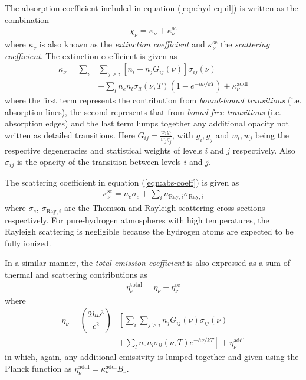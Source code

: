 		The absorption coefficient included in equation (\ref{eqn:hyd-equil}) is written as the combination
		\begin{align}
			\chi_\nu=\kappa_\nu+\kappa_\nu^\text{sc} \label{eqn:abs-coeff}
		\end{align}
		where $\kappa_\nu$ is also known as the \textit{extinction coefficient} and $\kappa_\nu^\text{sc}$ the \textit{scattering coefficient}. The extinction coefficient is given as
		\begin{align}
			\kappa_\nu=\sum_{i}&\sum_{j>i}{[n_i-n_jG_{ij}(\nu)]\sigma_{ij}(\nu)} \nonumber\\
							&+\sum_{l}{n_en_l\sigma_{ll}(\nu,T)\left( 1-e^{-h\nu/kT} \right)}+\kappa_\nu^\text{addl} \label{eqn:ext-abs-coeff}
		\end{align}
		where the first term represents the contribution from \textit{bound-bound transitions} (i.e. absorption lines), the second represents that from \textit{bound-free transitions} (i.e. absorption edges) and the last term lumps together any additional opacity not written as detailed transitions. Here $G_{ij}=\frac{w_ig_i}{w_jg_j}$, with $g_i,g_j$ and $w_i,w_j$ being the respective degeneracies and statistical weights of levels $i$ and $j$ respectively. Also $\sigma_{ij}$ is the opacity of the transition between levels $i$ and $j$.
		
		The scattering coefficient in equation (\ref{eqn:abs-coeff}) is given as
		\begin{align}
			\kappa_\nu^\text{sc}=n_e\sigma_e + \sum_i{n_{\text{Ray},i}\sigma_{\text{Ray},i}} \label{eqn:sca-abs-coeff}
		\end{align}
		where $\sigma_e$, $\sigma_{\text{Ray},i}$ are the Thomson and Rayleigh scattering cross-sections respectively. For pure-hydrogen atmospheres with high temperatures, the Rayleigh scattering is negligible because the hydrogen atoms are expected to be fully ionized.
		
		In a similar manner, the \textit{total emission coefficient} is also expressed as a sum of thermal and scattering contributions as
		\begin{align}
			\eta_\nu^\text{total}=\eta_\nu+\eta_\nu^\text{sc} \label{eqn:em-coeff}
		\end{align}
		where
		\begin{align}
			\eta_\nu=\left(\dfrac{2h\nu^3}{c^2}\right)&\left[ \sum_{i}\sum_{j>i}{n_jG_{ij}(\nu)\sigma_{ij}(\nu)} \right. \nonumber\\
							&\left.+\sum_{l}{n_en_l\sigma_{ll}(\nu,T)e^{-h\nu/kT}}\right]+\eta_\nu^\text{addl} \label{eqn:ext-em-coeff}
		\end{align}
		in which, again, any additional emissivity is lumped together and given using the Planck function as $\eta_\nu^\text{addl}=\kappa_\nu^\text{addl}B_\nu$.
		
